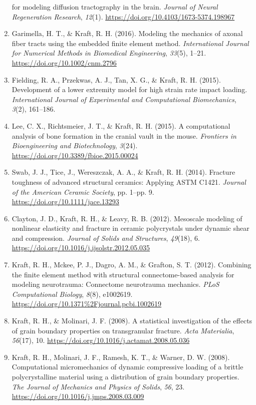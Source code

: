 \documentclass[
]{article}
\begin{document}
\begin{enumerate}
  for modeling diffusion tractography in the brain. \emph{Journal of
  Neural Regeneration Research}, \emph{12}(1).
  \url{https://doi.org/10.4103/1673-5374.198967}
\item
  Garimella, H. T., \& Kraft, R. H. (2016). Modeling the mechanics of
  axonal fiber tracts using the embedded finite element method.
  \emph{International Journal for Numerical Methods in Biomedical
  Engineering}, \emph{33}(5), 1--21.
  \url{https://doi.org/10.1002/cnm.2796}
\item
  Fielding, R. A., Przekwas, A. J., Tan, X. G., \& Kraft, R. H. (2015).
  Development of a lower extremity model for high strain rate impact
  loading. \emph{International Journal of Experimental and Computational
  Biomechanics}, \emph{3}(2), 161--186.
\item
  Lee, C. X., Richtsmeier, J. T., \& Kraft, R. H. (2015). A
  computational analysis of bone formation in the cranial vault in the
  mouse. \emph{Frontiers in Bioengineering and Biotechnology},
  \emph{3}(24). \url{https://doi.org/10.3389/fbioe.2015.00024}
\item
  Swab, J. J., Tice, J., Wereszczak, A. A., \& Kraft, R. H. (2014).
  Fracture toughness of advanced structural ceramics: Applying ASTM
  C1421. \emph{Journal of the American Ceramic Society}, pp. 1--pp. 9.
  \url{https://doi.org/10.1111/jace.13293}
\item
  Clayton, J. D., Kraft, R. H., \& Leavy, R. B. (2012). Mesoscale
  modeling of nonlinear elasticity and fracture in ceramic polycrystals
  under dynamic shear and compression. \emph{Journal of Solids and
  Structures}, \emph{49}(18), 6.
  \url{https://doi.org/10.1016/j.ijsolstr.2012.05.035}
\item
  Kraft, R. H., Mckee, P. J., Dagro, A. M., \& Grafton, S. T. (2012).
  Combining the finite element method with structural connectome-based
  analysis for modeling neurotrauma: Connectome neurotrauma mechanics.
  \emph{PLoS Computational Biology}, \emph{8}(8), e1002619.
  \url{https://doi.org/10.1371\%2Fjournal.pcbi.1002619}
\item
  Kraft, R. H., \& Molinari, J. F. (2008). A statistical investigation
  of the effects of grain boundary properties on transgranular fracture.
  \emph{Acta Materialia}, \emph{56}(17), 10.
  \url{https://doi.org/10.1016/j.actamat.2008.05.036}
\item
  Kraft, R. H., Molinari, J. F., Ramesh, K. T., \& Warner, D. W. (2008).
  Computational micromechanics of dynamic compressive loading of a
  brittle polycrystalline material using a distribution of grain
  boundary properties. \emph{The Journal of Mechanics and Physics of
  Solids}, \emph{56}, 23.
  \url{https://doi.org/10.1016/j.jmps.2008.03.009}
\end{enumerate}
\end{document}
